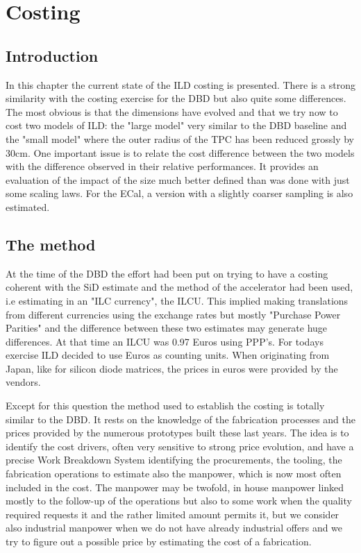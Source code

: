 \chapter{Costing}
\section{Introduction}
In this chapter the current state of the ILD costing is presented. There is a strong similarity with the costing exercise for the DBD but also quite some differences. The most obvious is that the dimensions have evolved and that we try now to cost two models of ILD: the "large model" very similar to the DBD baseline and the "small model" where the outer radius of the TPC has been reduced grossly by 30cm. One important issue is to relate  the cost difference between the two models with the difference observed in their relative performances. It provides an evaluation of the impact of the size much better defined than was done with just some scaling laws. For the ECal, a version with a slightly coarser sampling is also estimated.

\section{The method}
At the time of the DBD the effort had been put on trying to have a costing coherent with the SiD estimate and the method of the accelerator had been used, i.e estimating in an "ILC currency", the ILCU. This implied making translations from different currencies using the exchange rates but mostly "Purchase Power Parities" and the difference between these two estimates may generate huge differences. At that time an ILCU was 0.97 Euros using PPP's. For todays exercise ILD decided to use Euros as counting units. When originating from Japan, like for silicon diode matrices, the prices in euros were provided by the vendors.

Except for this question the method used to establish the costing is totally similar to the DBD. It rests on the knowledge of the fabrication processes and the prices provided by the numerous prototypes built these last years.  The idea is to identify the cost drivers, often very sensitive to strong price evolution, and have a precise Work Breakdown System identifying the procurements, the tooling, the fabrication operations to estimate also the manpower, which is now most often included in the cost. The manpower may be twofold, in house manpower linked mostly to the follow-up of the operations but also to some work when the quality required requests it and the rather limited amount permits it, but we consider also industrial manpower when we do not have already industrial offers and we try to figure out a possible price by estimating the cost of a fabrication.

